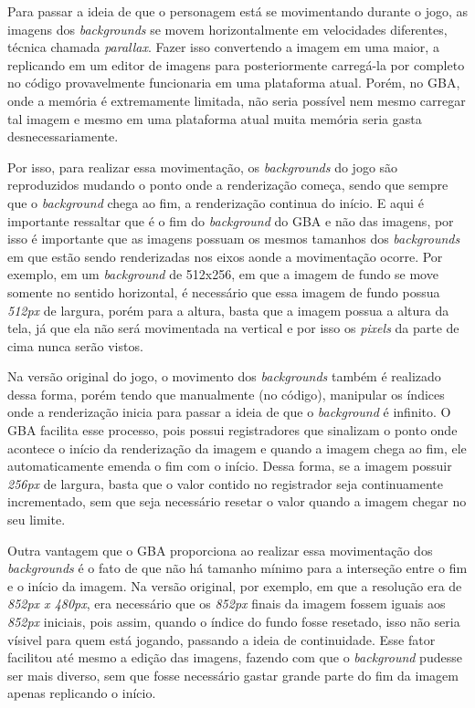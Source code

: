Para passar a ideia de que o personagem está se movimentando durante o jogo, as imagens dos \textit{backgrounds} se movem horizontalmente em velocidades diferentes, técnica chamada \textit{parallax}. Fazer isso convertendo a imagem em uma maior, a replicando em um editor de imagens para posteriormente carregá-la por completo no código provavelmente funcionaria em uma plataforma atual. Porém, no GBA, onde a memória é extremamente limitada, não seria possível nem mesmo carregar tal imagem e mesmo em uma plataforma atual muita memória seria gasta desnecessariamente.

Por isso, para realizar essa movimentação, os \textit{backgrounds} do jogo são reproduzidos mudando o ponto onde a renderização começa, sendo que sempre que o \textit{background} chega ao fim, a renderização continua do início. E aqui é importante ressaltar que é o fim do \textit{background} do GBA e não das imagens, por isso é importante que as imagens possuam os mesmos tamanhos dos \textit{backgrounds} em que estão sendo renderizadas nos eixos aonde a movimentação ocorre. Por exemplo, em um \textit{background} de 512x256, em que a imagem de fundo se move somente no sentido horizontal, é necessário que essa imagem de fundo possua \textit{512px} de largura, porém para a altura, basta que a imagem possua a altura da tela, já que ela não será movimentada na vertical e por isso os \textit{pixels} da parte de cima nunca serão vistos.

Na versão original do jogo, o movimento dos \textit{backgrounds} também é realizado dessa forma, porém tendo que manualmente (no código), manipular os índices onde a renderização inicia para passar a ideia de que o \textit{background} é infinito. O GBA facilita esse processo, pois possui registradores que sinalizam o ponto onde acontece o início da renderização da imagem e quando a imagem chega ao fim, ele automaticamente emenda o fim com o início. Dessa forma, se a imagem possuir \textit{256px} de largura, basta que o valor contido no registrador seja continuamente incrementado, sem que seja necessário resetar o valor quando a imagem chegar no seu limite.

Outra vantagem que o GBA proporciona ao realizar essa movimentação dos \textit{backgrounds} é o fato de que não há tamanho mínimo para a interseção entre o fim e o início da imagem. Na versão original, por exemplo, em que a resolução era de \textit{852px x 480px}, era necessário que os \textit{852px} finais da imagem fossem iguais aos \textit{852px} iniciais, pois assim, quando o índice do fundo fosse resetado, isso não seria vísivel para quem está jogando, passando a ideia de continuidade. Esse fator facilitou até mesmo a edição das imagens, fazendo com que o \textit{background} pudesse ser mais diverso, sem que fosse necessário gastar grande parte do fim da imagem apenas replicando o início.

